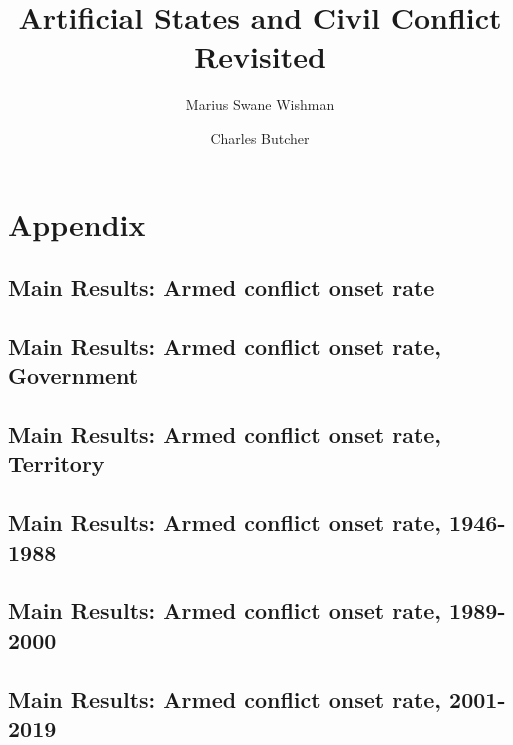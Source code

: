 \documentclass[12pt]{article}
\title{Artificial States and Civil Conflict Revisited}
\author[1]{Marius Swane Wishman}
\author[1]{Charles Butcher}
\affil[1]{Department of Sociology and Political Science, NTNU}
\date{}
\begin{document}
\tableofcontents

\pagebreak

\singlespacing


\section{Appendix}

\subsection{Main Results: Armed conflict onset rate}

    
    
\clearpage    

\subsection{Main Results: Armed conflict onset rate, Government}

    
    
        
\clearpage    
  
\subsection{Main Results: Armed conflict onset rate, Territory}

    
    
    
\clearpage        

\subsection{Main Results: Armed conflict onset rate, 1946-1988}

    
 
    
\clearpage     
  
\subsection{Main Results: Armed conflict onset rate, 1989-2000}

    
    
    
\clearpage    


\subsection{Main Results: Armed conflict onset rate, 2001-2019}
\end{document}
